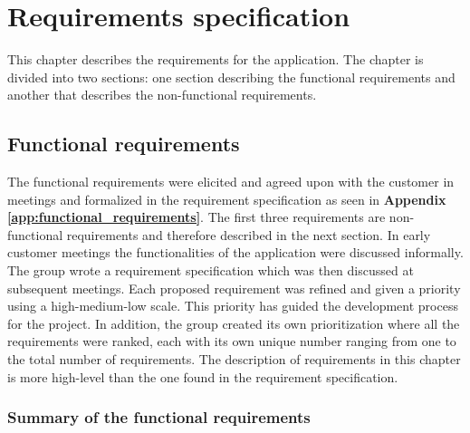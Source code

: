 
\chapter{Requirements specification}

This chapter describes the requirements for the application. The chapter is divided into two sections: one section describing the functional requirements and another that describes the non-functional requirements.

\section{Functional requirements}

The functional requirements were elicited and agreed upon with the customer in meetings and formalized in the requirement specification as seen in \textbf{Appendix \ref{app:functional_requirements}}. The first three requirements are non-functional requirements and therefore described in the next section. In early customer meetings the functionalities of the application were discussed informally. The group wrote a requirement specification which was then discussed at subsequent meetings. Each proposed requirement was refined and given a priority using a high-medium-low scale. This priority has guided the development process for the project. In addition, the group created its own prioritization where all the requirements were ranked, each with its own unique number ranging from one to the total number of requirements. The description of requirements in this chapter is more high-level than the one found in the requirement specification. 

\subsection{Summary of the functional requirements}
\label{subsec:summary_functional_requirements}

